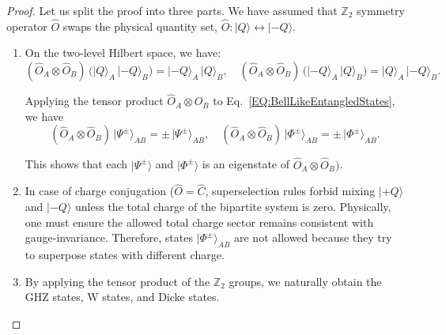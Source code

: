 \documentclass[10pt,a4paper]{amsart}
\begin{document}
\begin{proof}
	Let us split the proof into three parts.
	We have assumed that $\mathbb{Z}_{2}$ symmetry operator $\hat{O}$ swaps the physical quantity set, $\hat{O}: \lvert Q\rangle\leftrightarrow \lvert -Q\rangle$.
	\begin{enumerate}
		\item On the two-level Hilbert space, we have:
		\[
		(\hat{O}_A \otimes \hat{O}_B)\,\bigl(\lvert Q\rangle_A \,\lvert -Q\rangle_B\bigr)
		= \lvert -Q\rangle_A \,\lvert Q\rangle_B,
		\quad
		(\hat{O}_A \otimes \hat{O}_B)\,\bigl(\lvert -Q\rangle_A \,\lvert Q\rangle_B\bigr)
		= \lvert Q\rangle_A \,\lvert -Q\rangle_B.
		\]
		
		Applying the tensor product $\hat{O}_A \otimes \hat{O}_B$ to Eq.~\eqref{EQ:BellLikeEntangledStates}, we have
		\[
		(\hat{O}_A \otimes \hat{O}_B)\,\lvert \Psi^\pm\rangle_{AB}
		= \pm\,\lvert \Psi^\pm\rangle_{AB},
		\quad
		(\hat{O}_A \otimes \hat{O}_B)\,\lvert \Phi^\pm\rangle_{AB}
		= \pm\,\lvert \Phi^\pm\rangle_{AB}.
		\]
		
		This shows that each $\lvert \Psi^\pm\rangle$ and $\lvert \Phi^\pm\rangle$ is an eigenstate of $\hat{O}_A \otimes \hat{O}_B)$.
		
		\item In case of charge conjugation ($\hat{O} = \hat{C}$, superselection rules forbid mixing $\lvert +Q\rangle$ and $\lvert -Q\rangle$ unless the total charge of the bipartite system is zero.
		Physically, one must ensure the allowed total charge sector remains consistent with gauge-invariance.
		Therefore, states $\lvert \Phi^{\pm} \rangle_{AB}$ are not allowed because they try to superpose states with different charge.
		
		\item By applying the tensor product of the $\mathbb{Z}_{2}$ groups, we naturally obtain the GHZ states, W states, and Dicke states.
	\end{enumerate}
\end{proof}
\end{document}
